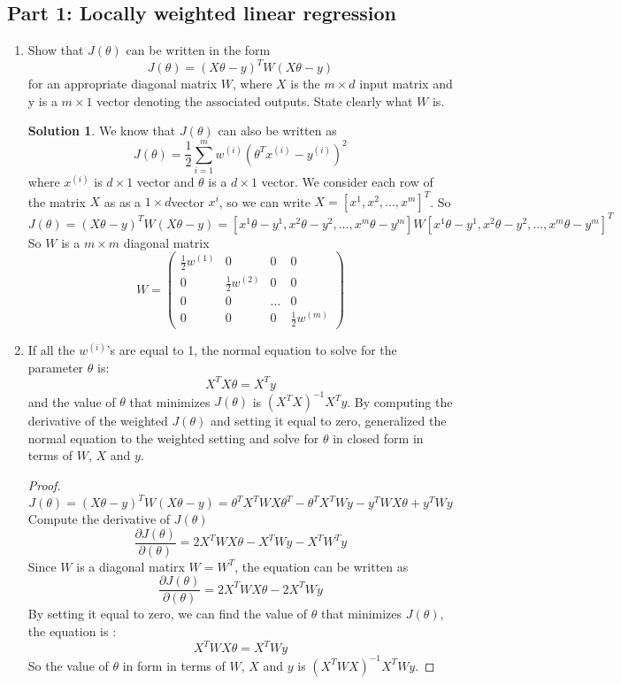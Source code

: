 \documentclass[]{book}
\theoremstyle{definition}
\newtheorem*{soln}{Solution}
\begin{document}
\subsection*{Part 1: Locally weighted linear regression}
\begin{enumerate}
	\item Show that $J(\theta)$ can be written in the form
	$$J(\theta)=(X \theta - y)^T W (X \theta - y)$$
	for an appropriate diagonal matrix $W$, where $X$ is the $m \times d$ input matrix and y is a $m \times 1$ vector denoting the associated outputs. State clearly what $W$ is.
\begin{soln}
	We know that $J(\theta)$ can also be written as 
	$$J(\theta)=\frac{1}{2} \sum_{i=1}^{m} w^{(i)} (\theta^T x^{(i)} - y^{(i)})^2$$
	where $x^{(i)}$ is $d \times 1$ vector and $\theta$ is a $d \times 1$ vector. We consider each row of the matrix $X$ as as a $1 \times d$vector $x^i$, so we can write $X = [x^1, x^2, ..., x^m]^T$. So
	$$J(\theta)=(X \theta - y)^T W (X \theta - y)
	=[x^1 \theta - y^1, x^2 \theta - y^2,...,x^m \theta - y^m] W [x^1 \theta - y^1, x^2 \theta - y^2,...,x^m \theta - y^m]^T$$
	So $W$ is a $m \times m$ diagonal matrix
	$$W=\left(\begin{matrix}
	\frac{1}{2}w^{(1)} & 0 & 0 & 0 \\ 
		0 & \frac{1}{2} w^{(2)} & 0 & 0 \\ 
		0 & 0 & ... & 0  \\ 
		0 & 0 & 0 & \frac{1}{2} w^{(m)}
	
	\end{matrix}\right)$$ 
\end{soln}
	
	\item If all the $w^{(i)}$'s are equal to 1, the normal equation to solve for the parameter $\theta$ is:
	$$X^T X \theta = X^T y$$
	and the value of $\theta$ that minimizes $J(\theta)$ is $(X^T X)^{-1} X^T y$. By computing the derivative of the weighted $J(\theta)$ and setting it equal to zero, generalized the normal equation to the weighted setting and solve for $\theta$ in closed form in terms of $W$, $X$ and $y$.
\begin{proof}
	$$J(\theta)=(X \theta - y)^T W (X \theta - y)=\theta^T X^T W X \theta^T - \theta^T X^T W y - y^T W X \theta + y^T W y$$
	Compute the derivative of $J(\theta)$
	$$\frac{\partial{J(\theta)}}{\partial(\theta)}=2 X^T W X \theta -X^T W y - X^T W^T y$$
	Since $W$ is a diagonal matirx $W = W^T$, the equation can be written as
	$$\frac{\partial{J(\theta)}}{\partial(\theta)} = 2 X^T W X \theta -2 X^T W y$$
	By setting it equal to zero, we can find the value of $\theta$ that minimizes $J(\theta)$, the equation is :
	$$X^T W X \theta = X^T W y $$
	So the value of $\theta$ in form in terms of $W$, $X$ and $y$ is $(X^T W X)^{-1} X^T W y$.
\end{proof} 


\end{enumerate}
\end{document}
